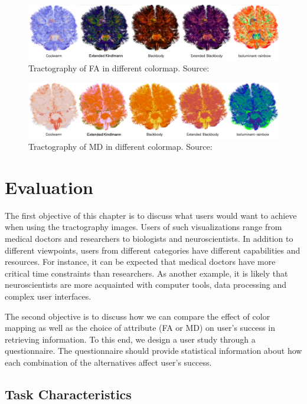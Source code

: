 \documentclass[a4paper, 12pt]{report}
\begin{document}
\begin{figure}[ht]
    \centering
    \includegraphics[width = 0.9\columnwidth]{7}
    \caption{Tractography of FA in different colormap. Source:  \cite{???}}
    \label{fig:7}
\end{figure}

\begin{figure}[ht]
    \centering
    \includegraphics[width = 0.9\columnwidth]{8}
    \caption{Tractography of MD in different colormap. Source:  \cite{???}}
    \label{fig:8}
\end{figure}

\chapter{Evaluation}

The first objective of this chapter is to discuss what users would want to achieve when using the tractography images. Users of such visualizations range from medical doctors and researchers to biologists and neuroscientists. In addition to different viewpoints, users from different categories have different capabilities and resources. For instance, it can be expected that medical doctors have more critical time constraints than researchers. As another example, it is likely that neuroscientists are more acquainted with computer tools, data processing and complex user interfaces.

The second objective is to discuss how we can compare the effect of color mapping as well as the choice of attribute (FA or MD) on user's success in retrieving information. To this end, we design a user study through a questionnaire. The questionnaire should provide statistical information about how each combination of the alternatives affect user's success. 

\section{Task Characteristics}
\end{document}
